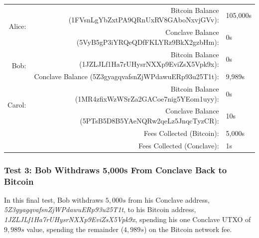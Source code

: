\documentclass{report}
\begin{document}
			
			\begin{center}
			\bgroup
			\small
			\def\arraystretch{1.5}
			\begin{tabular}{|r|r|l|}
			\hline
			\multirow{2}{*}{Alice:}    & Bitcoin Balance (1FVsnLgYbZxtPA9QRnUxRV8GAboNxvjGVv):    & 105,000s \\ \cline{2-3} 
						               & Conclave Balance (5VyB5gP3iYRQeQDfFKLYRz9BkX2gzbHm):   & 0s \\ \hline
			\multirow{2}{*}{Bob:}      & Bitcoin Balance (1JZLJLf1Ha7rUHysrNXXp9EviZsX5Vpk9x):    & 0s \\ \cline{2-3} 
						               & Conclave Balance (5Z3gyagqvafsnZjWPdawuERp93u25T1t):   & 9,989s \\ \hline
			\multirow{2}{*}{Carol:}    & Bitcoin Balance (1MR4zfixWzWSrZa2GACoe7nig5YEom1uyy):    & 0s \\ \cline{2-3} 
						               & Conclave Balance (5PTsB5D8B5YAeNQRw2qeLz5JnqcTyzCR):   & 10s \\ \hline
			\multicolumn{2}{|r|}{Fees Collected (Bitcoin):}  & 5,000s \\ \hline
			\multicolumn{2}{|r|}{Fees Collected (Conclave):} & 1s \\ \hline
			\end{tabular}
			\egroup
			\bigbreak
			\normalsize
			\end{center}
			
			
			
			
			
			
			\subsubsection{Test 3: Bob Withdraws 5,000s From Conclave Back to Bitcoin}
			In this final test, Bob withdraws $5,000s$ from his Conclave address, \textit{5Z3gyagqvafsnZjWPdawuERp93u25T1t}, to his Bitcoin address, \textit{1JZLJLf1Ha7rUHysrNXXp9EviZsX5Vpk9x}, spending his one Conclave UTXO of $9,989s$ value, spending the remainder ($4,989s$) on the Bitcoin network fee.
			
			
			
\end{document}
